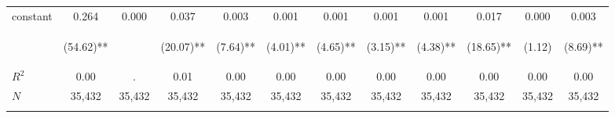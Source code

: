 \begin{tabular}{lccccccccccc}
\noalign{\smallskip}constant & 0.264 & 0.000 & 0.037 & 0.003 & 0.001 & 0.001 & 0.001 & 0.001 & 0.017 & 0.000 & 0.003\\
 & \begin{footnotesize}(54.62)**\end{footnotesize} & \begin{footnotesize}\end{footnotesize} & \begin{footnotesize}(20.07)**\end{footnotesize} & \begin{footnotesize}(7.64)**\end{footnotesize} & \begin{footnotesize}(4.01)**\end{footnotesize} & \begin{footnotesize}(4.65)**\end{footnotesize} & \begin{footnotesize}(3.15)**\end{footnotesize} & \begin{footnotesize}(4.38)**\end{footnotesize} & \begin{footnotesize}(18.65)**\end{footnotesize} & \begin{footnotesize}(1.12)\end{footnotesize} & \begin{footnotesize}(8.69)**\end{footnotesize}\\
\noalign{\smallskip}$R^2$ & 0.00 & . & 0.01 & 0.00 & 0.00 & 0.00 & 0.00 & 0.00 & 0.00 & 0.00 & 0.00\\
$N$ & 35,432 & 35,432 & 35,432 & 35,432 & 35,432 & 35,432 & 35,432 & 35,432 & 35,432 & 35,432 & 35,432\\
\noalign{\smallskip}\hline\hline\end{tabular}
